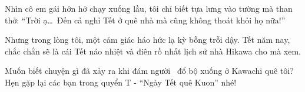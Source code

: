 \documentclass[../main.tex]{subfiles}
\begin{document}
Nhìn cô em gái hớn hở chạy xuống lầu, tôi chỉ biết tựa lưng vào tường mà than thở: ``Trời ạ\dots\ Đến cả nghỉ Tết ở quê nhà mà cũng không thoát khỏi họ nữa!''

Nhưng trong lòng tôi, một cảm giác háo hức lạ kỳ bỗng trỗi dậy. Tết năm nay, chắc chắn sẽ là cái Tết náo nhiệt và điên rồ nhất lịch sử nhà Hikawa cho mà xem.

Muốn biết chuyện gì đã xảy ra khi đám người \hll\ đổ bộ xuống ở Kawachi quê tôi? Hẹn gặp lại các bạn trong quyển T - ``Ngày Tết quê Kuon'' nhé!










\end{document}
